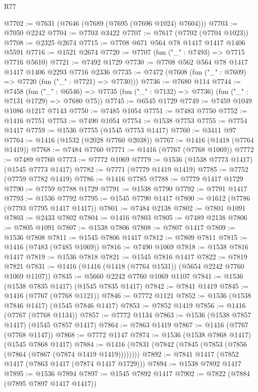 \begin{lexlean}{R77}
\begin{coremodule}
{{@7702 := @7631 (@7646 (@7689 (@7695 (@7696 @1024) @7604)))
@7703 := @7050 @2242
@7704 := @7703 @3422
@7707 := @7617 (@7702 (@7704 @1023))
@7708 := @2325 @2674
@7715 := @7708 @671 @564 @78 @1417 @1417 @1406 @5591
@7716 := @1521 @2674
@7720 := @7707 (fun ("_" : @7493) => @7715 @7716 @5610)
@7721 := @7492 @1729
@7730 := @7708 @562 @564 @78 @1417 @1417 @1406 @2293 @7716 @2336
@7735 := @7472 (@7608 (fun ("_" : @7609) => @7720 (fun ("_" : @7721) => @7730)))
@7736 := @7680 @114
@7744 := @7458
    (fun ("_" : @6546) => @7735 (fun ("_" : @7132) => @7736) (fun ("_" : @7131 @1729) => @7680 @75))
@7745 := @6545 @1729
@7749 := @7459 @1049 @1086 @1217 @7143
@7750 := @7485 @1054
@7751 := @7483 @7750
@7752 := @1416 @7751
@7753 := @7490 @1054
@7754 := @1538 @7753
@7755 := @7754 @1417
@7759 := @1536 @7755 (@1545 @7753 @1417)
@7760 := @3411 @97
@7764 := @1416 (@1532 (@2028 @7760 @2038))
@7767 := @1416 (@1418 (@7764 @1419))
@7768 := @7484 @7760
@7771 := @1416 (@7767 (@7768 @1069))
@7772 := @7489 @7760
@7773 := @7772 @1069
@7779 := @1536 (@1538 @7773 @1417) (@1545 @7773 @1417)
@7782 := @7771 (@7779 @1419 @1419)
@7785 := @7752 (@7759 @7782 @1419)
@7786 := @1416 @7785
@7788 := @7779 @1417 @1729
@7790 := @7759 @7788 @1729
@7791 := @1538 @7790
@7792 := @7791 @1417
@7793 := @1536 @7792
@7795 := @1545 @7790 @1417
@7800 := @1612 (@7786 (@7793 @7795 @1417 @1417))
@7801 := @7484 @2138
@7802 := @7801 @1091
@7803 := @2433 @7802
@7804 := @1416 @7803
@7805 := @7489 @2138
@7806 := @7805 @1091
@7807 := @1538 @7806
@7808 := @7807 @1417
@7809 := @1536 @7808
@7811 := @1545 @7806 @1417
@7812 := @7809 @7811
@7815 := @1416 (@7483 (@7485 @1069))
@7816 := @7490 @1069
@7818 := @1538 @7816 @1417
@7819 := @1536 @7818
@7821 := @1545 @7816 @1417
@7822 := @7819 @7821
@7831 := @1416 (@1416 (@1418 (@7764 @1531)) (@5654 @2242 @7760 @1069 @1107))
@7835 := @5660 @2242 @7760 @1069 @1107
@7841 := @1536 (@1538 @7835 @1417) (@1545 @7835 @1417)
@7842 := @7841 @1419
@7845 := @1416 (@7767 (@7768 @1121))
@7846 := @7772 @1121
@7852 := @1536 (@1538 @7846 @1417) (@1545 @7846 @1417)
@7853 := @7852 @1419
@7856 := @1416 (@7767 (@7768 @1134))
@7857 := @7772 @1134
@7863 := @1536 (@1538 @7857 @1417) (@1545 @7857 @1417)
@7864 := @7863 @1419
@7867 := @1416 (@7767 (@7768 @1147))
@7868 := @7772 @1147
@7874 := @1536 (@1538 @7868 @1417) (@1545 @7868 @1417)
@7884 := @1416 (@7831 (@7842 (@7845 (@7853 (@7856 (@7864 (@7867 (@7874 @1419 @1419))))))))
@7892 := @7841 @1417 (@7852 @1417 (@7863 @1417 (@7874 @1417 @1729)))
@7894 := @1538 @7892 @1417
@7895 := @1536 @7894
@7897 := @1545 @7892 @1417
@7902 := @7822 (@7884 (@7895 @7897 @1417 @1417))
}}
\end{coremodule}
\end{lexlean}

